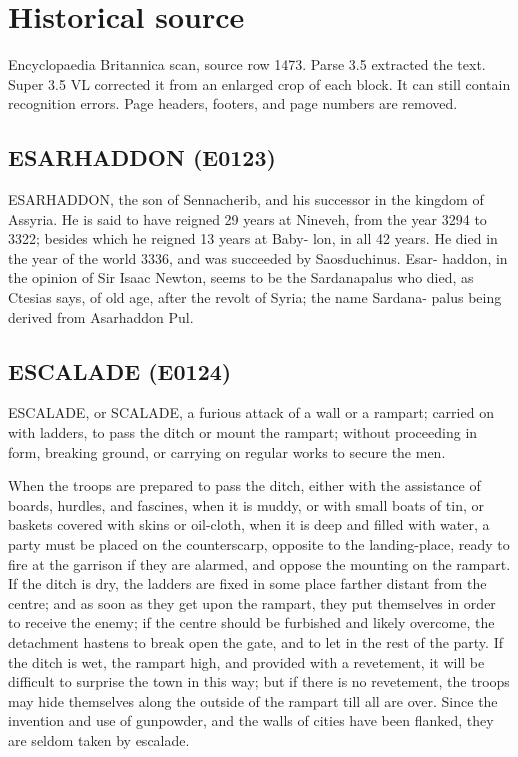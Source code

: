 \documentclass{article}
\begin{document}
\section*{Historical source}
Encyclopaedia Britannica scan, source row 1473. Parse 3.5 extracted the text. Super 3.5 VL corrected it from an enlarged crop of each block. It can still contain recognition errors.
Page headers, footers, and page numbers are removed.

\subsection*{ESARHADDON (E0123)}
ESARHADDON, the son of Sennacherib, and his
successor in the kingdom of Assyria. He is said to
have reigned 29 years at Nineveh, from the year 3294
to 3322; besides which he reigned 13 years at Baby-
lon, in all 42 years. He died in the year of the world
3336, and was succeeded by Saosduchinus. Esar-
haddon, in the opinion of Sir Isaac Newton, seems to
be the Sardanapalus who died, as Ctesias says, of
old age, after the revolt of Syria; the name Sardana-
palus being derived from Asarhaddon Pul.

\subsection*{ESCALADE (E0124)}
ESCALADE, or SCALADE, a furious attack of a
wall or a rampart; carried on with ladders, to pass the
ditch or mount the rampart; without proceeding in
form, breaking ground, or carrying on regular works
to secure the men.

When the troops are prepared to pass the ditch,
either with the assistance of boards, hurdles, and fascines, when it is muddy, or with small boats of tin, or
baskets covered with skins or oil-cloth, when it is deep
and filled with water, a party must be placed on the
counterscarp, opposite to the landing-place, ready to
fire at the garrison if they are alarmed, and oppose the
mounting on the rampart. If the ditch is dry, the
ladders are fixed in some place farther distant from the
centre; and as soon as they get upon the rampart,
they put themselves in order to receive the enemy; if
the centre should be furbished and likely overcome,
the detachment hastens to break open the gate, and to
let in the rest of the party. If the ditch is wet, the
rampart high, and provided with a revetement, it will
be difficult to surprise the town in this way; but if
there is no revetement, the troops may hide themselves
along the outside of the rampart till all are over. Since the invention and use of gunpowder, and the
walls of cities have been flanked, they are seldom taken
by escalade.
\end{document}
